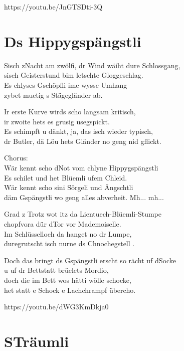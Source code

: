 \documentclass[
  letterpaper,
  a5paper]{memoir}
\begin{document}
https://youtu.be/JnGTSDti-3Q

\hypertarget{ds-hippygspuxe4ngstli}{%
\chapter{Ds Hippygspängstli}\label{ds-hippygspuxe4ngstli}}

S\textquotesingle isch z\textquotesingle Nacht am zwölfi, dr Wind wäiht
dure Schlossgang,\\
s\textquotesingle isch Geisterstund bim letschte Gloggeschlag.\\
Es chlyses Gschöpfli ime wysse Umhang\\
zybet muetig s Stägegländer ab.

Ir erste Kurve wird\textquotesingle s scho langsam kritisch,\\
ir zwoite hets es grusig usegspickt.\\
Es schimpft u dänkt, ja, das isch wieder typisch,\\
dr Butler, dä Löu het\textquotesingle s Gländer no geng nid gflickt.

Chorus:\\
Wär kennt scho d\textquotesingle Not vom chlyne Hippygspängstli\\
Es schilet und het Blüemli ufem Chleid.\\
Wär kennt scho sini Sörgeli und Ängschtli\\
däm Gspängstli wo geng alles abverheit. Mh... mh...

Grad z Trotz wot itz da Lientuech-Blüemli-Stumpe\\
chopfvora dür d\textquotesingle Tor vor Mademoiselle.\\
Im Schlüsselloch da hanget no dr Lumpe,\\
duregrutscht isch nurne ds Chnochegstell .

Doch das bringt ds Gspängstli erscht so rächt uf
d\textquotesingle Socke\\
u uf dr Bettstatt brüelet\textquotesingle s Mordio,\\
doch die im Bett wo\textquotesingle s hätti wölle schocke,\\
het statt e Schock e Lachchrampf übercho.

https://youtu.be/dWG3KmDkja0

\hypertarget{struxe4umli}{%
\chapter{S\textquotesingle Träumli}\label{struxe4umli}}
\end{document}

